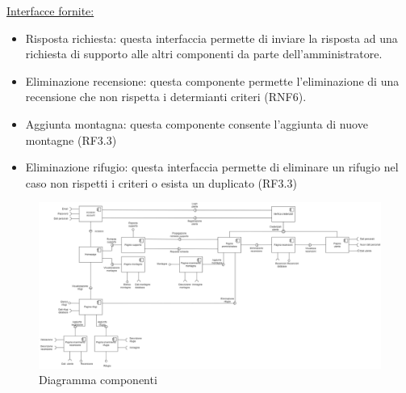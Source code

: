 \documentclass[a4paper,12pt]{article}
\begin{document}
\underline{Interfacce fornite:}
\begin{itemize}
\item Risposta richiesta: questa interfaccia permette di inviare la risposta ad una richiesta di supporto alle altri componenti da parte dell'amministratore.
\item Eliminazione recensione: questa componente permette l'eliminazione di una recensione che non rispetta i determianti criteri (RNF6).
\item Aggiunta montagna: questa componente consente l'aggiunta di nuove montagne (RF3.3)
\item Eliminazione rifugio: questa interfaccia permette di eliminare un rifugio nel caso non rispetti i criteri o esista un duplicato (RF3.3)
\end{itemize}



\begin{figure}[H]
   \centering
   \includegraphics[width=1.5\textwidth, angle = 90]{
    img-D2/diagramma_componenti.png}
    \caption{Diagramma componenti}
\end{figure}
\end{document}
